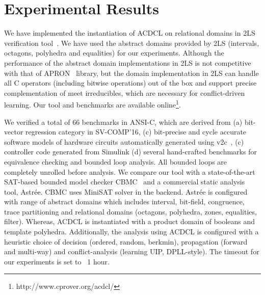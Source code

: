 \section{Experimental Results}
We have implemented the instantiation of ACDCL on relational domains
in 2LS verification tool~\cite{2ls}.  We have used the abstract domains
provided by 2LS (intervals, octagons, polyhedra and equalities) for our
experiments. Although the performance of the abstract domain implementations 
in 2LS is not competitive with that of APRON~\cite{apron} library, but 
the domain implementation in 2LS can handle all C operators 
(including bitwise operations) out of the box and support precise
complementation of meet irreducibles, which are necessary for conflict-driven 
learning. Our tool and benchmarks are available online\footnote{http://www.cprover.org/acdcl/}.

We verified a total of 66 benchmarks in ANSI-C, which are derived from 
(a) bit-vector regression category in SV-COMP'16, (c) bit-precise and 
cycle accurate software models of hardware circuits automatically 
generated using v2c~\cite{mtk2016}, (c) controller code generated 
from Simulink (d) several hand-crafted benchmarks for equivalence 
checking and bounded loop analysis.  All bounded loops are completely 
unrolled before analysis.  We compare our tool with a state-of-the-art 
SAT-based bounded model checker CBMC~\cite{cbmc} and a commercial 
static analysis tool, Astr{\'e}e.  CBMC uses MiniSAT solver in the backend.  
Astr{\'e}e is configured with range of abstract domains which includes 
interval, bit-field, congruence, trace partitioning and relational 
domains (octagons, polyhedra, zones, equalities, filter).  Whereas, 
ACDCL is instantiated with a product domain of booleans and template 
polyhedra.  Additionally, the analysis using ACDCL is configured with 
a heuristic choice of decision (ordered, random, berkmin), 
propagation (forward and multi-way) and conflict-analysis (learning UIP,
DPLL-style).  The timeout for our experiments is set to ~1 hour. 
%
